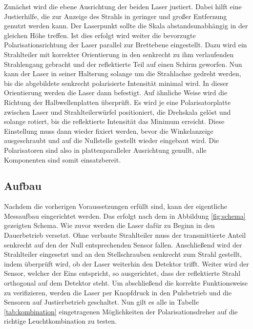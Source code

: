 Zunächst wird die ebene Ausrichtung der beiden Laser justiert. Dabei hilft eine Justierhilfe, die zur Anzeige des Strahls in geringer
und großer Entfernung genutzt werden kann. Der Laserpunkt sollte die Skala abstandsunabhängig in der gleichen Höhe treffen. Ist dies
erfolgt wird weiter die bevorzugte Polarisationsrichtung der Laser parallel zur Brettebene eingestellt. Dazu wird ein Strahlteiler mit
korrekter Orientierung in den senkrecht zu ihm verlaufenden Strahlengang gebracht und der reflektierte Teil auf einen Schirm geworfen.
Nun kann der Laser in seiner Halterung solange um die Strahlachse gedreht werden, bis die abgebildete senkrecht polarisierte Intensität 
minimal wird. In dieser Orientierung werden die Laser dann befestigt. Auf ähnliche Weise wird die Richtung der Halbwellenplatten
überprüft. Es wird je eine Polarisatorplatte zwischen Laser und Strahlteilerwürfel positioniert, die Drehskala gelöst und solange
rotiert, bis die reflektierte Intensität das Minimum erreicht. Diese Einstellung muss dann wieder fixiert werden, bevor die
Winkelanzeige ausgeschraubt und auf die Nullstelle gestellt wieder eingebaut wird. Die Polarisatoren sind also in plattenparalleler
Ausrichtung genullt, alle Komponenten sind somit einsatzbereit.



\subsection{Aufbau}

Nachdem die vorherigen Voraussetzungen erfüllt sind, kann der eigentliche Messaufbau eingerichtet werden. Das erfolgt nach dem in
Abbildung \ref{fig:schema} gezeigten Schema. Wie zuvor werden die Laser dafür zu Beginn in den Dauerbetrieb versetzt. Ohne verbaute
Strahlteiler muss der transmittierte Anteil senkrecht auf den der Null entsprechenden Sensor fallen. Anschließend wird der Strahlteiler
eingesetzt und an den Stellschrauben senkrecht zum Strahl gestellt, indem überprüft wird, ob der Laser weiterhin den Detektor trifft.
Weiter wird der Sensor, welcher der Eins entspricht, so ausgerichtet, dass der reflektierte Strahl orthogonal auf dem Detektor steht.
Um abschließend die korrekte Funktionsweise zu verifizieren, werden die Laser per Knopfdruck in den Pulsbetrieb und die Sensoren auf
Justierbetrieb geschaltet. Nun gilt es alle in Tabelle \ref{tab:kombination} eingetragenen Möglichkeiten der Polarisationsdreher auf
die richtige Leuchtkombination zu testen.

